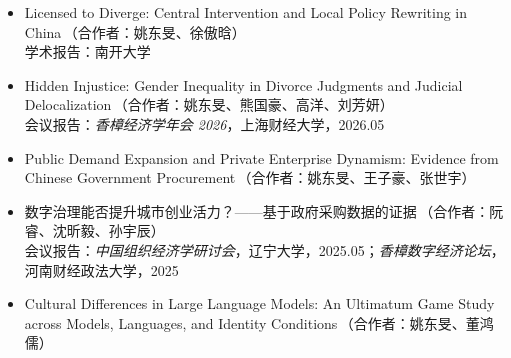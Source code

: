 \documentclass[a4paper,10pt]{article}
\renewcommand*{\with}[1]{\,（合作者：#1）}
\begin{document}
\begin{itemize}

\item Licensed to Diverge: Central Intervention and Local Policy Rewriting in China\with{姚东旻、徐傲晗}\\
  学术报告：南开大学

\item Hidden Injustice: Gender Inequality in Divorce Judgments and Judicial Delocalization\with{姚东旻、熊国豪、高洋、刘芳妍}\\
  会议报告：\textit{香樟经济学年会 2026}，上海财经大学，2026.05

\item Public Demand Expansion and Private Enterprise Dynamism: Evidence from Chinese Government Procurement\with{姚东旻、王子豪、张世宇}

\item 数字治理能否提升城市创业活力？——基于政府采购数据的证据\with{阮睿、沈昕毅、孙宇辰}\\
  会议报告：\textit{中国组织经济学研讨会}，辽宁大学，2025.05；\textit{香樟数字经济论坛}，河南财经政法大学，2025

\item Cultural Differences in Large Language Models: An Ultimatum Game Study across Models, Languages, and Identity Conditions\with{姚东旻、董鸿儒}

\end{itemize}

\end{document}
